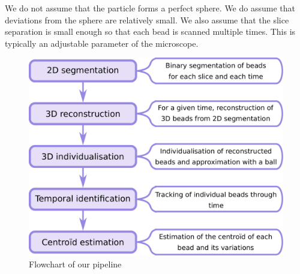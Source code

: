 \documentclass{llncs}
\begin{document}
We do not assume that the particle forms a perfect sphere. We do assume that deviations from the sphere are relatively small. We also assume that the slice separation is small enough so that each bead is scanned multiple times. This is typically an adjustable parameter of the microscope.


\begin{figure}[htb]
\centering
\includegraphics[width =  0.8\linewidth]{images/flowchart.pdf}
\caption{Flowchart of our pipeline}
\label{fig:flowchart}
\end{figure}
\end{document}
